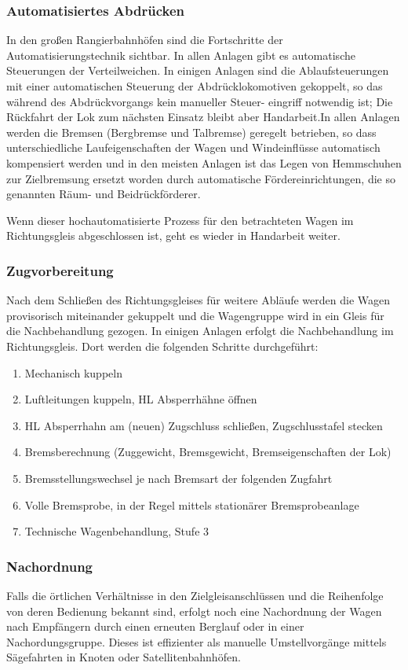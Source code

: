 \subsubsection{Automatisiertes Abdrücken}\label{sec:automAbdruecken}
In den großen Rangierbahnhöfen sind die Fortschritte der Automatisierungstechnik sichtbar. In allen Anlagen gibt es automatische Steuerungen der Verteilweichen. In einigen Anlagen sind die Ablaufsteuerungen mit einer automatischen Steuerung der Abdrücklokomotiven gekoppelt, so das während des Abdrückvorgangs kein manueller Steuer- eingriff notwendig ist; Die Rückfahrt der Lok zum nächsten Einsatz bleibt aber Handarbeit.In allen Anlagen werden die Bremsen (Bergbremse und Talbremse) geregelt betrieben, so dass unterschiedliche Laufeigenschaften der Wagen und Windeinflüsse automatisch kompensiert werden und in den meisten Anlagen ist das Legen von Hemmschuhen zur Zielbremsung ersetzt worden durch automatische Fördereinrichtungen, die so genannten Räum- und Beidrückförderer.\par
Wenn dieser hochautomatisierte Prozess für den betrachteten Wagen im Richtungsgleis abgeschlossen ist, geht es wieder in Handarbeit weiter.
\subsubsection{Zugvorbereitung}\label{sec:Zugvorbereitung}
Nach dem Schließen des Richtungsgleises für weitere Abläufe werden die Wagen provisorisch miteinander gekuppelt und die Wagengruppe wird in ein Gleis für die Nachbehandlung gezogen. In einigen Anlagen erfolgt die Nachbehandlung im Richtungsgleis. Dort werden die folgenden Schritte durchgeführt:
\begin{enumerate}
    \item Mechanisch kuppeln
    \item Luftleitungen kuppeln, \acrshort{HL} Absperrhähne öffnen
    \item \acrshort{HL} Absperrhahn am (neuen) \gls{Zugschluss} schließen, Zugschlusstafel stecken
    \item Bremsberechnung (Zuggewicht, Bremsgewicht, Bremseigenschaften der Lok)
    \item Bremsstellungswechsel je nach Bremsart der folgenden \gls{Zugfahrt}
    \item Volle \gls{Bremsprobe}, in der Regel mittels stationärer \gls{Bremsprobeanlage}
    \item Technische Wagenbehandlung, Stufe 3
\end{enumerate}
\subsubsection{Nachordnung}\label{sec:Nachordnung}
Falls die örtlichen Verhältnisse in den Zielgleisanschlüssen und die Reihenfolge von deren Bedienung bekannt sind, erfolgt noch eine Nachordnung der Wagen nach Empfängern durch einen erneuten Berglauf oder in einer Nachordungsgruppe. Dieses ist effizienter als manuelle Umstellvorgänge mittels Sägefahrten in Knoten oder Satellitenbahnhöfen.

